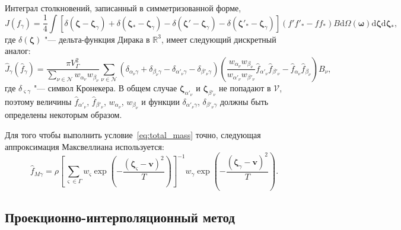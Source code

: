 \documentclass[
aps,%
12pt,%
final,%
notitlepage,%
oneside,%
onecolumn,%
nobibnotes,%
nofootinbib,%
superscriptaddress,%
noshowpacs,%
showkeys,%
floatfix,%
tightenlines,%
centertags]%
{revtex4}
\newcommand{\dd}{\mathrm{d}}
\newcommand{\dzeta}{\boldsymbol{\dd\zeta}}
\newcommand{\bzeta}{\boldsymbol{\zeta}}
\newcommand{\Nu}{\mathcal{N}}
\begin{document}
Интеграл столкновений, записанный в симметризованной форме,
\begin{equation}\label{eq:symm_ci}
    J(f_\gamma) = \frac14\int \left[
        \delta(\bzeta-\bzeta_\gamma) + \delta(\bzeta_*-\bzeta_\gamma)
        - \delta(\bzeta'-\bzeta_\gamma) - \delta(\bzeta'_*-\bzeta_\gamma)\right]
        (f'f'_* - ff_*)B \dd\Omega(\boldsymbol{\omega}) \dzeta\dzeta_*,
\end{equation}
где \(\delta(\bzeta)\) "--- дельта-функция Дирака в \(\mathbb{R}^3\),
имеет следующий дискретный аналог:
\begin{equation}\label{eq:discrete_symm_ci}
    \hat{J}_\gamma(\hat{f}_\gamma) =
        \frac{\pi V_\Gamma^2}{\sum_{\nu\in\Nu} w_{\alpha_\nu}w_{\beta_\nu}}
        \sum_{\nu\in\Nu} \left(
            \delta_{\alpha_\nu\gamma} + \delta_{\beta_\nu\gamma}
            - \delta_{\alpha'_\nu\gamma} - \delta_{\beta'_\nu\gamma}
        \right)\left(
            \frac{w_{\alpha_\nu}w_{\beta_\nu}}{w_{\alpha'_\nu}w_{\beta'_\nu}}
            \hat{f}_{\alpha'_\nu}\hat{f}_{\beta'_\nu} - \hat{f}_{\alpha_\nu}\hat{f}_{\beta_\nu}
        \right)B_\nu,
\end{equation}
где \(\delta_{\varsigma\gamma}\) "--- символ Кронекера.
В общем случае \(\bzeta_{\alpha'_\nu}\) и \(\bzeta_{\beta'_\nu}\) не попадают в \(\mathcal{V}\),
поэтому величины \(\hat{f}_{\alpha'_\nu}\), \(\hat{f}_{\beta'_\nu}\), \(w_{\alpha_\nu}\), \(w_{\beta_\nu}\)
и функции \(\delta_{\alpha'_\nu\gamma}\), \(\delta_{\beta'_\nu\gamma}\) должны быть определены некоторым образом.

Для того чтобы выполнить условие~\eqref{eq:total_mass} точно, следующая аппроксимация Максвеллиана используется:
\begin{equation}\label{eq:discrete_Maxwellian}
    \hat{f}_{M\gamma} = \rho\left[\sum_{\varsigma\in\Gamma}w_\varsigma\exp
            \left(-\frac{(\bzeta_\varsigma - \boldsymbol{v})^2}{T}\right)
        \right]^{-1}
        w_\gamma\exp\left(-\frac{(\bzeta_\gamma - \boldsymbol{v})^2}{T}\right).
\end{equation}

\subsection{Проекционно-интерполяционный метод}
\end{document}
